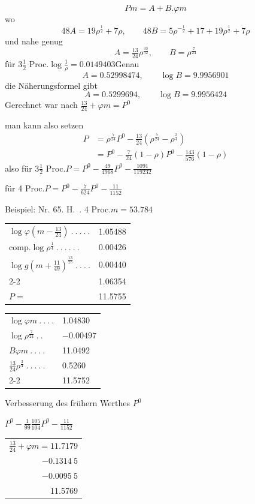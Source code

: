 \[
Pm=A+B\mathord{.}\varphi m
\]
\noindent wo
\[
48A=19\rho^{\frac{1}{2}}+7\rho,\qquad48B=5\rho^{-\frac{1}{2}}+17+19\rho^{\frac{1}{2}}+7\rho
\]
\noindent und nahe genug
\[
A=\tfrac{13}{24}\rho^{\frac{33}{52}},\qquad B=\rho^{\frac{7}{24}}
\]
\noindent für \(3\tfrac{1}{2}\) Proc.\quad \(\log\tfrac{1}{\rho}=0.0149403\)\quad Genau
\[
A=0.52998474,\qquad\log B=9.9956901
\]
\noindent die Näherungsformel gibt
\[
A=0.5299694,\qquad\log B=9.9956424
\]
\noindent Gerechnet war nach \(\tfrac{13}{24}+\varphi m=P^0\)\par
\noindent man kann also setzen
\[
\begin{aligned}
P&=\rho^{\frac{7}{24}}P^0-\tfrac{13}{24}(\rho^{\frac{7}{24}}-\rho^{\frac{3}{4}})\\
&=P^0-\tfrac{7}{24}(1-\rho)P^0-\tfrac{143}{576}(1-\rho)
\end{aligned}
\]
\noindent also für \(3\tfrac{1}{2}\) Proc.\quad \(P=P^0-\tfrac{49}{4968}P^0-\tfrac{1091}{119232}\)\par
\noindent für 4 Proc.\quad \(P=P^0-\tfrac{7}{624}P^0-\tfrac{11}{1152}\)

Beispiel: Nr. 65. H.\ . 4 Proc.\quad \(m=53.784\)
\begin{center}
\fontsize{8}{13}\selectfont\setlength{\tabcolsep}{2pt}
\begin{tabular}{ll}
\(\log\varphi(m-\tfrac{13}{24})\ .\ .\ .\ .\ .\)&1.05488\\
\(\text{comp.}\log\rho^{\frac{1}{4}}\ .\ .\ .\ .\ .\ .\)&0.00426\\
\(\log g(m+\tfrac{11}{49})^{\frac{13}{28}}\ .\ .\ .\ .\)&0.00440\\\cline{2-2}
&1.06354\\
\(P=\)&11.5755
\end{tabular}\qquad
\begin{tabular}{ll}
\(\log\varphi m\ .\ .\ .\ .\)&1.04830\\
\(\log\rho^{\frac{7}{24}}\ .\ .\)&\(-0.00497\)\\
\(B\varphi m\ .\ .\ .\ .\)&11.0492\\
\(\tfrac{13}{24}\rho^{\frac{3}{4}}\ .\ .\ .\ .\ .\)&0.5260\\\cline{2-2}
&11.5752
\end{tabular}\par\medskip
Verbesserung des frühern Werthes \(P^0\)\par\smallskip
\(P^0-\tfrac{1}{99}\tfrac{105}{104}P^0-\tfrac{11}{1152}\)\par\smallskip
\begin{tabular}{r}
\(\tfrac{13}{24}+\varphi m=11.7179\)\\
\(-0.1314\ 5\)\\
\(-0.0095\ 5\)\\\hline
11.5769
\end{tabular}
\end{center}

